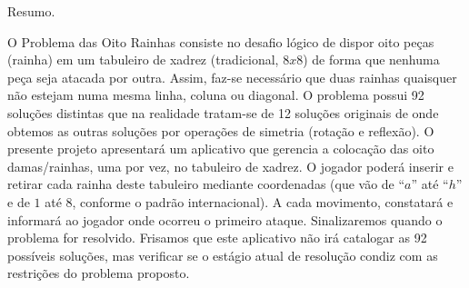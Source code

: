 
Resumo.

O Problema das Oito Rainhas consiste no desafio lógico de dispor oito peças (rainha) em um tabuleiro de xadrez (tradicional, $8x8$) de forma que nenhuma peça seja atacada por outra. Assim, faz-se necessário que duas rainhas quaisquer não estejam numa mesma linha, coluna ou diagonal. O problema possui 92 soluções distintas que na realidade tratam-se de 12 soluções originais de onde obtemos as outras soluções por operações de simetria (rotação e reflexão). O presente projeto apresentará um aplicativo que gerencia a colocação das oito damas/rainhas, uma por vez, no tabuleiro de xadrez. O jogador poderá inserir e retirar cada rainha deste tabuleiro mediante coordenadas (que vão de “$a$” até “$h$” e de $1$ até $8$, conforme o padrão internacional). A cada movimento, constatará e informará ao jogador onde ocorreu o primeiro ataque. Sinalizaremos quando o problema for resolvido. Frisamos que este aplicativo não irá catalogar as 92 possíveis soluções, mas verificar se o estágio atual de resolução condiz com as restrições do problema proposto.